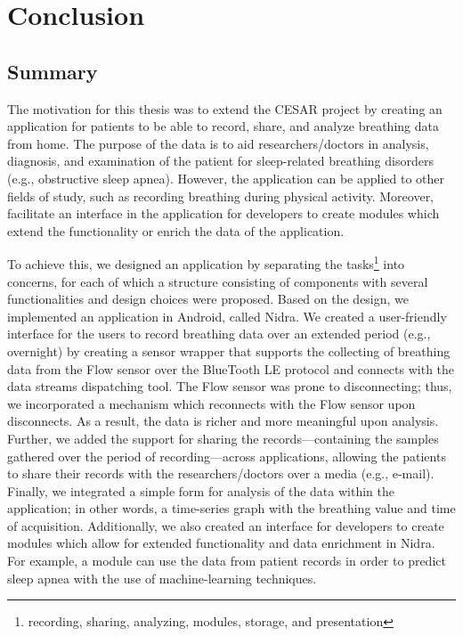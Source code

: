 \chapter{Conclusion}

\section{Summary}
The motivation for this thesis was to extend the CESAR project by creating an application for patients to be able to record, share, and analyze breathing data from home. The purpose of the data is to aid researchers/doctors in analysis, diagnosis, and examination of the patient for sleep-related breathing disorders (e.g., obstructive sleep apnea). However, the application can be applied to other fields of study, such as recording breathing during physical activity. Moreover, facilitate an interface in the application for developers to create modules which extend the functionality or enrich the data of the application.

To achieve this, we designed an application by separating the tasks\footnote{recording, sharing, analyzing, modules, storage, and presentation} into concerns, for each of which a structure consisting of components with several functionalities and design choices were proposed. Based on the design, we implemented an application in Android, called Nidra. We created a user-friendly interface for the users to record breathing data over an extended period (e.g., overnight) by creating a sensor wrapper that supports the collecting of breathing data from the Flow sensor over the BlueTooth LE protocol and connects with the data streams dispatching tool. The Flow sensor was prone to disconnecting; thus, we incorporated a mechanism which reconnects with the Flow sensor upon disconnects. As a result, the data is richer and more meaningful upon analysis. Further, we added the support for sharing the records---containing the samples gathered over the period of recording---across applications, allowing the patients to share their records with the researchers/doctors over a media (e.g., e-mail). Finally, we integrated a simple form for analysis of the data within the application; in other words, a time-series graph with the breathing value and time of acquisition. Additionally, we also created an interface for developers to create modules which allow for extended functionality and data enrichment in Nidra. For example, a module can use the data from patient records in order to predict sleep apnea with the use of machine-learning techniques.

